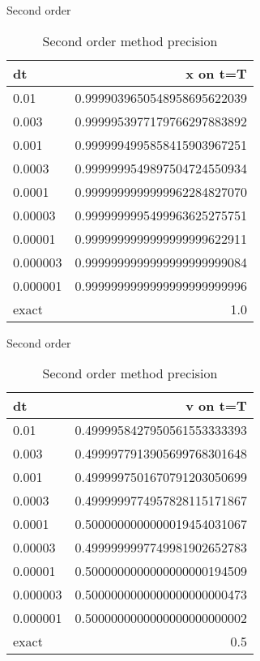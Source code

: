 \documentclass[10pt]{beamer}
\begin{document}
\begin{frame}{Second order}
  \begin{table}
    \caption{Second order method precision}
    \begin{tabular}{lr}
      \toprule
      dt & x on t=T\\
      \midrule
      0.01 &     0.9999039650548958695622039\\
      0.003 &    0.9999953977179766297883892\\
      0.001 &    0.9999994995858415903967251\\
      0.0003 &   0.9999999549897504724550934\\
      0.0001 &   0.9999999999999962284827070\\
      0.00003 &  0.9999999995499963625275751\\
      0.00001 &  0.9999999999999999999622911\\
      0.000003 & 0.9999999999999999999999084\\
      0.000001 & 0.9999999999999999999999996\\
      \midrule
      exact & 1.0 \\
      \bottomrule
    \end{tabular}
  \end{table}
\end{frame}

\begin{frame}{Second order}
  \begin{table}
    \caption{Second order method precision}
    \begin{tabular}{lr}
      \toprule
      dt & v on t=T\\
      \midrule
      0.01 &     0.4999958427950561553333393\\
      0.003 &    0.4999977913905699768301648\\
      0.001 &    0.4999997501670791203050699\\
      0.0003 &   0.4999999774957828115171867\\
      0.0001 &   0.5000000000000019454031067\\
      0.00003 &  0.4999999997749981902652783\\
      0.00001 &  0.5000000000000000000194509\\
      0.000003 & 0.5000000000000000000000473\\
      0.000001 & 0.5000000000000000000000002\\
      \midrule
      exact & 0.5 \\
      \bottomrule
    \end{tabular}
  \end{table}
\end{frame}
\end{document}
